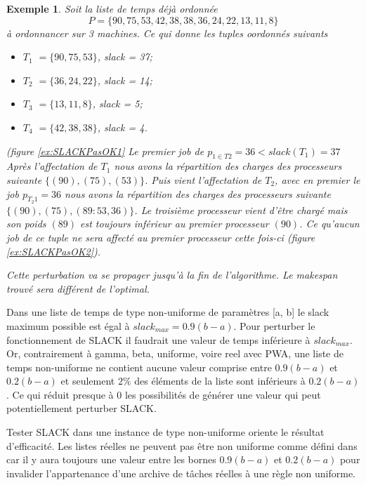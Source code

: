 \documentclass[a4paper,12pt]{report}
\theoremstyle{plain}				%
\newtheorem{example}{Exemple}
\theoremstyle{definition}				%
\newcommand{\lp}[1]{\todo[author=LP,color=yellow,inline]{#1}}
\begin{document}
\begin{example}
 
Soit la liste de temps déjà ordonnée $$P = \{90, 75, 53, 42, 38, 38, 36, 24, 22, 13, 11, 8\}$$ à ordonnancer sur 3 machines. Ce qui donne les tuples oordonnés suivants
\begin{itemize}
	\item $T_1$ $=\{90, 75, 53\}$, slack = 37;
	\item $T_2$ $=\{36, 24, 22\}$, slack = 14;
	\item $T_3$ $=\{13, 11, 8\}$, slack = 5;
	\item $T_4$ $=\{42, 38, 38\}$, slack = 4.
\end{itemize}
(figure \ref{ex:SLACKPasOK1}
Le premier job de $p_{1 \in T2}=36 < slack(T_1)=37$ %
Après l'affectation de $T_1$ nous avons la répartition des charges des 
 processeurs suivante $\{(90), (75), (53)\}$.
Puis vient l'affectation de $T_2$, avec en premier le job $p_{T_2 1}=36$
nous avons la répartition des charges des processeurs suivante $\{(90), (75), (89 : 53,36)\}$. Le troisième processeur vient d'être chargé mais son poids $(89)$ est toujours inférieur au premier processeur $(90)$. Ce qu'aucun job de ce tuple ne sera affecté au premier processeur cette fois-ci (figure \ref{ex:SLACKPasOK2}).

Cette perturbation va se propager jusqu’à la fin de l'algorithme. Le makespan trouvé sera différent de l'optimal. 
\end{example}

Dans une liste de temps de type non-uniforme de paramètres [a, b] le slack maximum possible 
  est égal à $slack_{max} = 0.9(b-a)$. 
Pour perturber le fonctionnement de SLACK il faudrait une valeur de temps inférieure à $slack_{max}$. 
Or, contrairement à gamma, beta, uniforme, voire reel avec PWA, 
  une liste de temps non-uniforme ne contient aucune valeur comprise entre $0.9(b-a)$ et $0.2(b-a)$ 
  et seulement $2\%$ des éléments de la liste sont inférieurs à $0.2(b-a)$.
Ce qui réduit presque à $0$ les possibilités de générer une valeur qui peut potentiellement perturber SLACK.

Tester SLACK dans une instance de type non-uniforme oriente le résultat d'efficacité.
Les listes réelles ne peuvent pas être non uniforme comme défini dans \cite{frangioni2004multi} 
  car il y aura toujours une valeur entre les bornes $0.9(b-a)$ et $0.2(b-a)$ pour invalider 
  l'appartenance d'une archive de tâches réelles à une règle non uniforme.         
\end{document}
